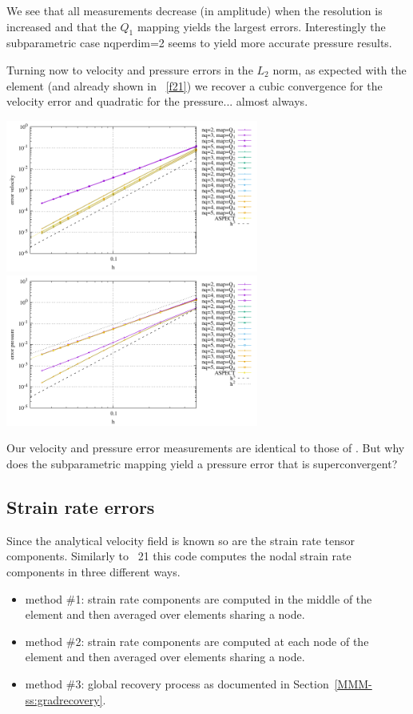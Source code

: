 We see that all measurements decrease (in amplitude) when the resolution is increased and that 
the $Q_1$ mapping yields the largest errors. 
Interestingly the subparametric case {\python nqperdim=2} seems to yield more accurate 
pressure results.

Turning now to velocity and pressure errors in the $L_2$ norm, 
as expected with the \QtwoQone element (and already shown in \stone~\ref{f21})
we recover a cubic convergence for the velocity error and quadratic for the 
pressure... almost always.

\begin{center}
\includegraphics[width=8.3cm]{python_codes/fieldstone_152/results/exp0/errv}
\includegraphics[width=8.3cm]{python_codes/fieldstone_152/results/exp0/errp}
\end{center}

Our velocity and pressure error measurements are identical to those of \aspect.
But why does the subparametric mapping yield a pressure error that is superconvergent?


\newpage

\subsection*{Strain rate errors}

Since the analytical velocity field is known so are the strain rate tensor components.
Similarly to \stone~21 this code computes the nodal strain rate components
in three different ways. 
\begin{itemize}
\item method \#1: strain rate components are computed in the middle of the element and then averaged over elements sharing a node.
\item method \#2: strain rate components are computed at each node of the element and then averaged over elements sharing a node.
\item method \#3: global recovery process as documented in Section~\ref{MMM-ss:gradrecovery}.
\end{itemize}


